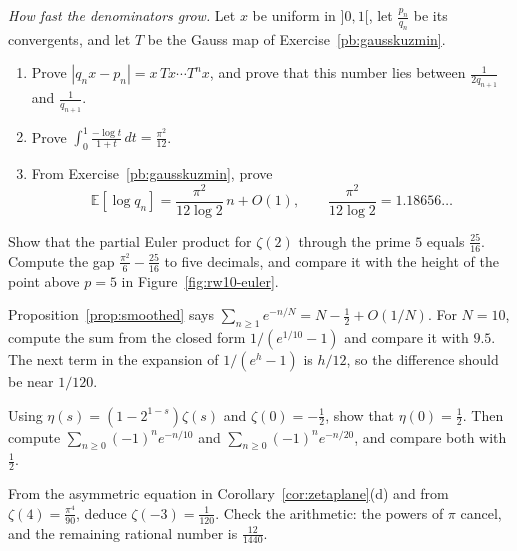 \begin{exercise}[$\star\star$]\label{pb:levy}
\emph{How fast the denominators grow.} Let $x$ be uniform in $]0,1[$, let $\frac{p_n}{q_n}$ be its convergents, and let $T$ be the Gauss map of Exercise~\ref{pb:gausskuzmin}.
\begin{enumerate}[label=(\alph*)]
\item Prove $|q_nx-p_n|=x\,Tx\cdots T^nx$, and prove that this number lies between $\frac1{2q_{n+1}}$ and $\frac1{q_{n+1}}$.
\item Prove $\int_0^1\frac{-\log t}{1+t}\,dt=\frac{\pi^2}{12}$.
\item From Exercise~\ref{pb:gausskuzmin}, prove
\[
\mathbb E[\log q_n]=\frac{\pi^2}{12\log2}\,n+O(1),\qquad\frac{\pi^2}{12\log2}=1.18656\ldots
\]
\end{enumerate}
\end{exercise}

\begin{exercise}[$\star$]\label{ex:rw10a}
Show that the partial Euler product for $\zeta(2)$ through the prime $5$ equals $\frac{25}{16}$. Compute the gap $\frac{\pi^2}6-\frac{25}{16}$ to five decimals, and compare it with the height of the point above $p=5$ in Figure~\ref{fig:rw10-euler}.
\end{exercise}

\begin{exercise}[$\star\star$]\label{ex:rw10b}
Proposition~\ref{prop:smoothed} says $\sum_{n\ge1}e^{-n/N}=N-\frac12+O(1/N)$. For $N=10$, compute the sum from the closed form $1/(e^{1/10}-1)$ and compare it with $9.5$. The next term in the expansion of $1/(e^h-1)$ is $h/12$, so the difference should be near $1/120$.
\end{exercise}

\begin{exercise}[$\star\star$]\label{ex:rw10c}
Using $\eta(s)=(1-2^{1-s})\zeta(s)$ and $\zeta(0)=-\frac12$, show that $\eta(0)=\frac12$. Then compute $\sum_{n\ge0}(-1)^ne^{-n/10}$ and $\sum_{n\ge0}(-1)^ne^{-n/20}$, and compare both with $\frac12$.
\end{exercise}

\begin{exercise}[$\star\star\star$]\label{ex:rw10d}
From the asymmetric equation in Corollary~\ref{cor:zetaplane}(d) and from $\zeta(4)=\frac{\pi^4}{90}$, deduce $\zeta(-3)=\frac1{120}$. Check the arithmetic: the powers of $\pi$ cancel, and the remaining rational number is $\frac{12}{1440}$.
\end{exercise}

